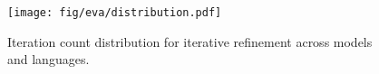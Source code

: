 \begin{figure}[htb]
    \centering
    \texttt{[image: fig/eva/distribution.pdf]}
    \caption{Iteration count distribution for iterative refinement across models and languages.}
    \label{fig:eva:dis}
\end{figure}


% 


% 

